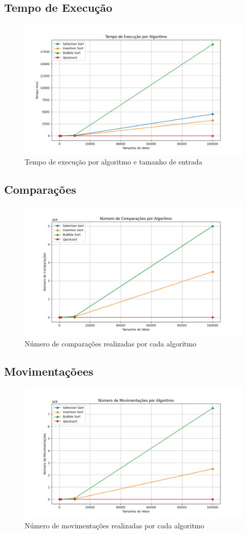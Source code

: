 \documentclass[12pt]{article}
\begin{document}
\subsection{Tempo de Execução}
\begin{figure}[H]
\centering
\includegraphics[width=.5\textwidth]{tempo.png}
\caption{Tempo de execução por algoritmo e tamanho de entrada}
\end{figure}

\subsection{Comparações}
\begin{figure}[H]
\centering
\includegraphics[width=.5\textwidth]{comparacoes.png}
\caption{Número de comparações realizadas por cada algoritmo}
\end{figure}

\subsection{Movimentaçõees}
\begin{figure}[H]
\centering
\includegraphics[width=.5\textwidth]{movimentacoes.png}
\caption{Número de movimentações realizadas por cada algoritmo}
\end{figure}
\end{document}
